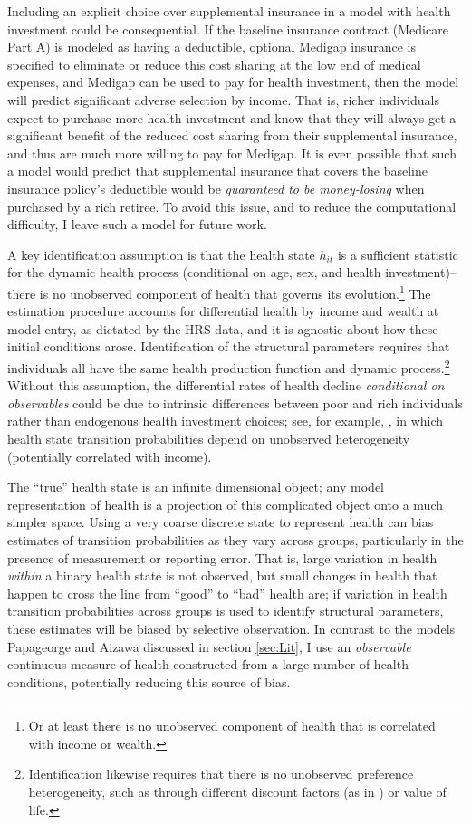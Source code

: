 \documentclass[12pt,pdftex,letterpaper]{article}
\newcommand{\Health}{h}
\begin{document}
Including an explicit choice over supplemental insurance in a model with health investment could be consequential.  If the baseline insurance contract (Medicare Part A) is modeled as having a deductible, optional Medigap insurance is specified to eliminate or reduce this cost sharing at the low end of medical expenses, and Medigap can be used to pay for health investment, then the model will predict significant adverse selection by income.  That is, richer individuals expect to purchase more health investment and know that they will always get a significant benefit of the reduced cost sharing from their supplemental insurance, and thus are much more willing to pay for Medigap.  It is even possible that such a model would predict that supplemental insurance that covers the baseline insurance policy's deductible would be \textit{guaranteed to be money-losing} when purchased by a rich retiree.  To avoid this issue, and to reduce the computational difficulty, I leave such a model for future work.

A key identification assumption is that the health state $\Health_{it}$ is a sufficient statistic for the dynamic health  process (conditional on age, sex, and health investment)-- there is no unobserved component of health that governs its evolution.\footnote{Or at least there is no unobserved component of health that is correlated with income or wealth.}  The estimation procedure accounts for differential health by income and wealth at model entry, as dictated by the HRS data, and it is agnostic about how these initial conditions arose.  Identification of the structural parameters requires that individuals all have the same health production function and dynamic process.\footnote{Identification likewise requires that there is no unobserved preference heterogeneity, such as through different discount factors (as in \cite{cstwMPC}) or value of life.} Without this assumption, the differential rates of health decline \textit{conditional on observables} could be due to intrinsic differences between poor and rich individuals rather than endogenous health investment choices; see, for example, \cite{pashchenko18}, in which health state transition probabilities depend on unobserved heterogeneity (potentially correlated with income).

The ``true'' health state is an infinite dimensional object; any model representation of health is a projection of this complicated object onto a much simpler space.  Using a very coarse discrete state to represent health can bias estimates of transition probabilities as they vary across groups, particularly in the presence of measurement or reporting error.  That is, large variation in health \textit{within} a binary health state is not observed, but small changes in health that happen to cross the line from ``good'' to ``bad'' health are; if variation in health transition probabilities across groups is used to identify structural parameters, these estimates will be biased by selective observation.  In contrast to the models Papageorge and Aizawa discussed in section \ref{sec:Lit}, I use an \textit{observable} continuous measure of health constructed from a large number of health conditions, potentially reducing this source of bias.
\end{document}
